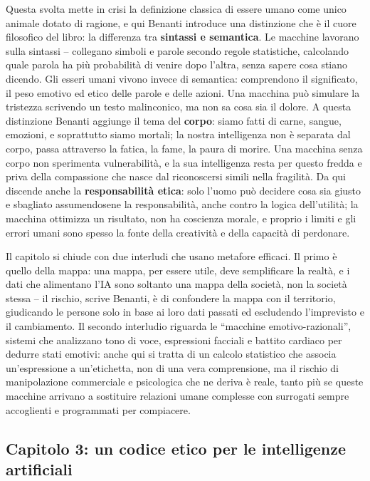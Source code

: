 \documentclass[a4paper,11pt]{article}
\begin{document}
Questa svolta mette in crisi la definizione classica di essere umano come unico animale dotato di ragione, e qui Benanti introduce una distinzione che è il cuore filosofico del libro: la differenza tra \textbf{sintassi e semantica}. Le macchine lavorano sulla sintassi -- collegano simboli e parole secondo regole statistiche, calcolando quale parola ha più probabilità di venire dopo l'altra, senza sapere cosa stiano dicendo. Gli esseri umani vivono invece di semantica: comprendono il significato, il peso emotivo ed etico delle parole e delle azioni. Una macchina può simulare la tristezza scrivendo un testo malinconico, ma non sa cosa sia il dolore. A questa distinzione Benanti aggiunge il tema del \textbf{corpo}: siamo fatti di carne, sangue, emozioni, e soprattutto siamo mortali; la nostra intelligenza non è separata dal corpo, passa attraverso la fatica, la fame, la paura di morire. Una macchina senza corpo non sperimenta vulnerabilità, e la sua intelligenza resta per questo fredda e priva della compassione che nasce dal riconoscersi simili nella fragilità. Da qui discende anche la \textbf{responsabilità etica}: solo l'uomo può decidere cosa sia giusto e sbagliato assumendosene la responsabilità, anche contro la logica dell'utilità; la macchina ottimizza un risultato, non ha coscienza morale, e proprio i limiti e gli errori umani sono spesso la fonte della creatività e della capacità di perdonare.

Il capitolo si chiude con due interludi che usano metafore efficaci. Il primo è quello della mappa: una mappa, per essere utile, deve semplificare la realtà, e i dati che alimentano l'IA sono soltanto una mappa della società, non la società stessa -- il rischio, scrive Benanti, è di confondere la mappa con il territorio, giudicando le persone solo in base ai loro dati passati ed escludendo l'imprevisto e il cambiamento. Il secondo interludio riguarda le ``macchine emotivo-razionali'', sistemi che analizzano tono di voce, espressioni facciali e battito cardiaco per dedurre stati emotivi: anche qui si tratta di un calcolo statistico che associa un'espressione a un'etichetta, non di una vera comprensione, ma il rischio di manipolazione commerciale e psicologica che ne deriva è reale, tanto più se queste macchine arrivano a sostituire relazioni umane complesse con surrogati sempre accoglienti e programmati per compiacere.

\subsection{Capitolo 3: un codice etico per le intelligenze artificiali}
\end{document}
